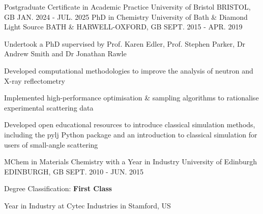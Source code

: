 \begin{cventries}
  \cventry
    {Postgraduate Certificate in Academic Practice}
    {University of Bristol}
    {BRISTOL, GB}
    {JAN. 2024 - JUL. 2025}
    {
    }
  \cventry
    {PhD in Chemistry}
    {University of Bath \& Diamond Light Source}
    {BATH \& HARWELL-OXFORD, GB}
    {SEPT. 2015 - APR. 2019}
    {
      \begin{cvitems}
        \item {Undertook a PhD supervised by Prof. Karen Edler, Prof. Stephen Parker, Dr Andrew Smith and Dr Jonathan Rawle}
        \item {Developed computational methodologies to improve the analysis of neutron and X-ray reflectometry}
        \item {Implemented high-performance optimisation \& sampling algorithms to rationalise experimental scattering data}
        \item {Developed open educational resources to introduce classical simulation methods, including the pylj Python package and an introduction to classical simulation for users of small-angle scattering}
      \end{cvitems}
    }
  \cventry
    {MChem in Materials Chemistry with a Year in Industry}
    {University of Edinburgh}
    {EDINBURGH, GB}
    {SEPT. 2010 - JUN. 2015}
    {
      \begin{cvitems}
        \item {Degree Classification: \textbf{First Class}}
        \item {Year in Industry at Cytec Industries in Stamford, US}
      \end{cvitems}
    }
\end{cventries}
